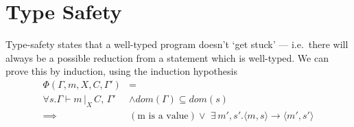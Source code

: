 \documentclass[a4paper, english]{article}
\begin{document}
	\section{Type Safety}\label{type-safety}


	Type-safety states that a well-typed program doesn't `get stuck' --- i.e.\ there will always be a possible reduction from a statement which is well-typed. We can prove this by induction, using the induction hypothesis 
	\begin{align*}
	  \label{indHyp}
	\Phi(\Gamma, m, X, C, \Gamma') &=   \\
	\forall s . \Gamma \vdash m \, |_X\,  C, \, \Gamma' &\wedge dom (\Gamma) \subseteq dom(s) \\ 
	\implies &(\textrm{m is a value})  \vee \,\, \exists \, m',s'. \langle m,s\rangle \rightarrow \langle m',s' \rangle \\
	\end{align*}	
\end{document}
